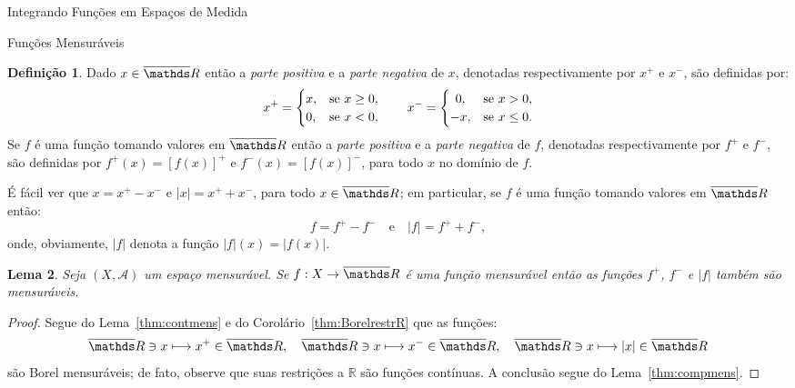 \documentclass[oneside,final,11pt]{amsbook}
\newcommand{\R}{\mathds R}
\theoremstyle{remark}\newtheorem{exercise}{Exercício}[chapter]
\theoremstyle{remark}\newtheorem{*exercise}[exercise]{\hbox to 0pt{\hskip 0pt minus 1fil*}Exercício}
\theoremstyle{definition}\newtheorem{exdefin}{Definição}[chapter]
\theoremstyle{plain}\newtheorem{teo}{Teorema}[section]
\theoremstyle{plain}\newtheorem{lem}[teo]{Lema}
\theoremstyle{plain}\newtheorem{prop}[teo]{Proposição}
\theoremstyle{plain}\newtheorem{cor}[teo]{Corolário}
\theoremstyle{definition}\newtheorem{defin}[teo]{Definição}
\theoremstyle{remark}\newtheorem{rem}[teo]{Observação}
\theoremstyle{definition}\newtheorem{notation}[teo]{Notação}
\theoremstyle{definition}\newtheorem{convention}[teo]{Convenção}
\theoremstyle{definition}\newtheorem{example}[teo]{Exemplo}
\numberwithin{section}{chapter}
\numberwithin{equation}{section}
\begin{document}
\begin{chapter}{Integrando Funções em Espaços de Medida}
\begin{section}{Funções Mensuráveis}
\begin{defin}
Dado $x\in\overline\R$ então a {\em parte positiva\/} e a {\em parte negativa\/}
de $x$, denotadas respectivamente por $x^+$ e $x^-$, são definidas por:
\[x^+=\begin{cases}
x,&\text{se $x\ge0$},\\
0,&\text{se $x<0$},
\end{cases}
\qquad
x^-=\begin{cases}
\hfil0,&\text{se $x>0$},\\
-x,&\text{se $x\le0$}.
\end{cases}\]
Se $f$ é uma função tomando valores em $\overline\R$ então a {\em parte positiva\/}
e a {\em parte negativa\/}
de $f$, denotadas respectivamente por $f^+$ e $f^-$,
são definidas por $f^+(x)=[f(x)]^+$ e $f^-(x)=[f(x)]^-$, para todo $x$ no domínio de $f$.
\end{defin}
É fácil ver que $x=x^+-x^-$ e $\vert x\vert=x^++x^-$, para todo $x\in\overline\R$;
em particular, se $f$ é uma função tomando valores em $\overline\R$ então:
\[f=f^+-f^-\quad\text{e}\quad\vert f\vert=f^++f^-,\]
onde, obviamente, $\vert f\vert$ denota a função $\vert f\vert(x)=\vert f(x)\vert$.

\begin{lem}\label{thm:fmaismenosmens}
Seja $(X,\mathcal A)$ um espaço mensurável. Se $f:X\to\overline\R$ é uma função mensurável
então as funções $f^+$, $f^-$ e $\vert f\vert$ também são mensuráveis.
\end{lem}
\begin{proof}
Segue do Lema~\ref{thm:contmens} e do Corolário~\ref{thm:BorelrestrR} que as funções:
\[\overline\R\ni x\longmapsto x^+\in\overline\R,\quad
\overline\R\ni x\longmapsto x^-\in\overline\R,\quad
\overline\R\ni x\longmapsto \vert x\vert\in\overline\R\]
são Borel mensuráveis; de fato, observe que suas restrições a $\R$ são funções contínuas.
A conclusão segue do Lema~\ref{thm:compmens}.
\end{proof}


\end{section}
\end{chapter}
\end{document}
